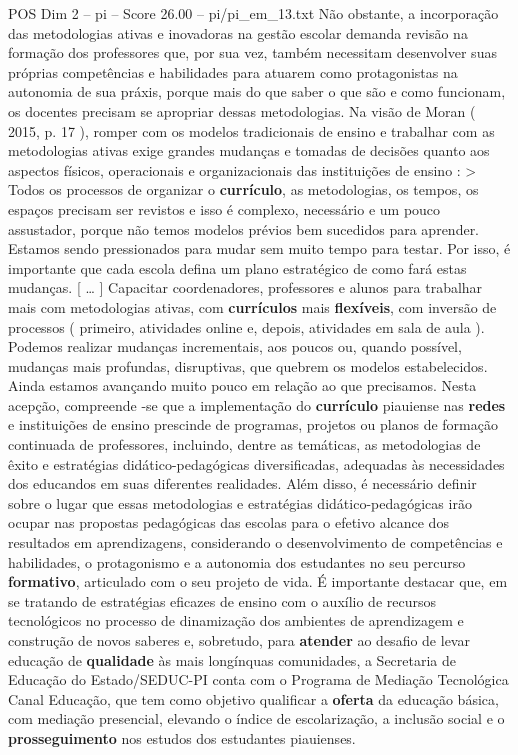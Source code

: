 \begin{textsample}{POS Dim 2 – pi – Score 26.00 – pi/pi\_em\_13.txt}
Não obstante, a incorporação das metodologias ativas e inovadoras na gestão escolar demanda revisão na formação dos professores que, por sua vez, também necessitam desenvolver suas próprias competências e habilidades para atuarem como protagonistas na autonomia de sua práxis, porque mais do que saber o que são e como funcionam, os docentes precisam se apropriar dessas metodologias.
Na visão de Moran ( 2015, p. 17 ), romper com os modelos tradicionais de ensino e trabalhar com as metodologias ativas exige grandes mudanças e tomadas de decisões quanto aos aspectos físicos, operacionais e organizacionais das instituições de ensino : > Todos os processos de organizar o \textbf{currículo}, as metodologias, os tempos, os espaços precisam ser revistos e isso é complexo, necessário e um pouco assustador, porque não temos modelos prévios bem sucedidos para aprender.
Estamos sendo pressionados para mudar sem muito tempo para testar.
Por isso, é importante que cada escola defina um plano estratégico de como fará estas mudanças. [ … ] Capacitar coordenadores, professores e alunos para trabalhar mais com metodologias ativas, com \textbf{currículos} mais \textbf{flexíveis}, com inversão de processos ( primeiro, atividades online e, depois, atividades em sala de aula ).
Podemos realizar mudanças incrementais, aos poucos ou, quando possível, mudanças mais profundas, disruptivas, que quebrem os modelos estabelecidos.
Ainda estamos avançando muito pouco em relação ao que precisamos.
Nesta acepção, compreende -se que a implementação do \textbf{currículo} piauiense nas \textbf{redes} e instituições de ensino prescinde de programas, projetos ou planos de formação continuada de professores, incluindo, dentre as temáticas, as metodologias de êxito e estratégias didático-pedagógicas diversificadas, adequadas às necessidades dos educandos em suas diferentes realidades.
Além disso, é necessário definir sobre o lugar que essas metodologias e estratégias didático-pedagógicas irão ocupar nas propostas pedagógicas das escolas para o efetivo alcance dos resultados em aprendizagens, considerando o desenvolvimento de competências e habilidades, o protagonismo e a autonomia dos estudantes no seu percurso \textbf{formativo}, articulado com o seu projeto de vida.
É importante destacar que, em se tratando de estratégias eficazes de ensino com o auxílio de recursos tecnológicos no processo de dinamização dos ambientes de aprendizagem e construção de novos saberes e, sobretudo, para \textbf{atender} ao desafio de levar educação de \textbf{qualidade} às mais longínquas comunidades, a Secretaria de Educação do Estado/SEDUC-PI conta com o Programa de Mediação Tecnológica Canal Educação, que tem como objetivo qualificar a \textbf{oferta} da educação básica, com mediação presencial, elevando o índice de escolarização, a inclusão social e o \textbf{prosseguimento} nos estudos dos estudantes piauienses.

\end{textsample}
